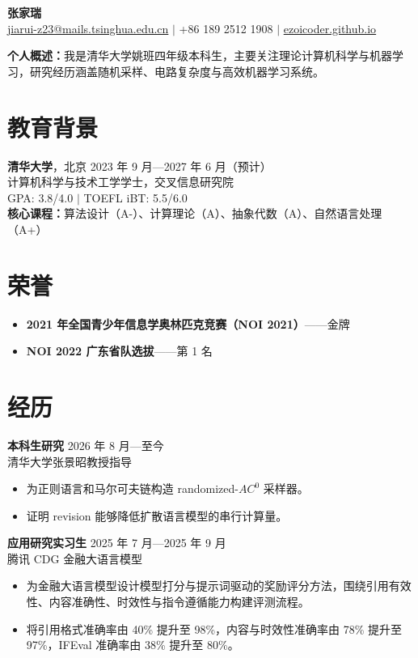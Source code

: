 \documentclass[11pt,a4paper]{article}
\newcommand{\entry}[4]{%
  \textbf{#1} \hfill {\small #2}\\[-1pt]
  #3 \hfill {\small #4}%
}
\begin{document}
\begin{center}
  {\LARGE\bfseries\color{textgray} {张家瑞}}\\[3pt]
  \href{mailto:jiarui-z23@mails.tsinghua.edu.cn}{jiarui-z23@mails.tsinghua.edu.cn}
  \quad $\vert$ \quad +86 189 2512 1908
  \quad $\vert$ \quad \href{https://ezoicoder.github.io}{ezoicoder.github.io}
\end{center}

\vspace{-3pt}
\textbf{个人概述：}我是清华大学姚班四年级本科生，主要关注理论计算机科学与机器学习，研究经历涵盖随机采样、电路复杂度与高效机器学习系统。

\section*{教育背景}
\textbf{清华大学}，北京 \hfill {\small 2023 年 9 月—2027 年 6 月（预计）}\\[-1pt]
计算机科学与技术工学学士，交叉信息研究院\\[-1pt]
GPA: 3.8/4.0 \quad $\vert$ \quad TOEFL iBT: 5.5/6.0\\[-1pt]
\textbf{核心课程：}算法设计（A-）、计算理论（A）、抽象代数（A）、自然语言处理（A+）

\section*{荣誉}
\begin{itemize}
  \item \textbf{2021 年全国青少年信息学奥林匹克竞赛（NOI 2021）}——金牌
  \item \textbf{NOI 2022 广东省队选拔}——第 1 名
\end{itemize}

\section*{经历}
\entry{本科生研究}{2026 年 8 月—至今}{清华大学张景昭教授指导}{}
\begin{itemize}
  \item 为正则语言和马尔可夫链构造 randomized-$AC^0$ 采样器。
  \item 证明 revision 能够降低扩散语言模型的串行计算量。
\end{itemize}

\entry{应用研究实习生}{2025 年 7 月—2025 年 9 月}{腾讯 CDG}{金融大语言模型}
\begin{itemize}
  \item 为金融大语言模型设计模型打分与提示词驱动的奖励评分方法，围绕引用有效性、内容准确性、时效性与指令遵循能力构建评测流程。
  \item 将引用格式准确率由 40\% 提升至 98\%，内容与时效性准确率由 78\% 提升至 97\%，IFEval 准确率由 38\% 提升至 80\%。
\end{itemize}
\end{document}

